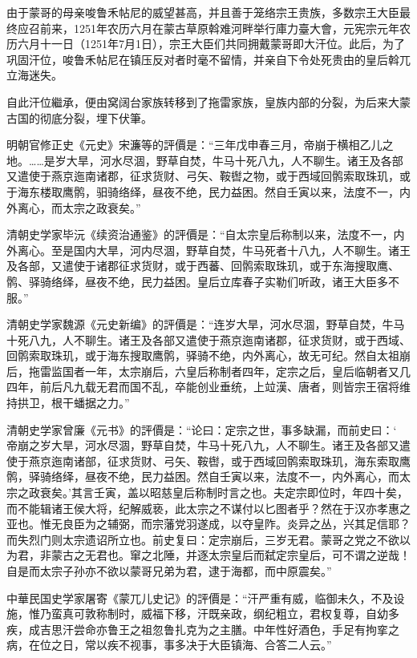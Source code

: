 由于蒙哥的母亲唆鲁禾帖尼的威望甚高，并且善于笼络宗王贵族，多数宗王大臣最终应召前来，1251年农历六月在蒙古草原斡难河畔举行庫力臺大會，元宪宗元年农历六月十一日（1251年7月1日），宗王大臣们共同拥戴蒙哥即大汗位。此后，为了巩固汗位，唆鲁禾帖尼在镇压反对者时毫不留情，并亲自下令处死贵由的皇后斡兀立海迷失。

自此汗位繼承，便由窝阔台家族转移到了拖雷家族，皇族内部的分裂，为后来大蒙古国的彻底分裂，埋下伏筆。

明朝官修正史《元史》宋濂等的評價是：“三年戊申春三月，帝崩于横相乙儿之地。……是岁大旱，河水尽涸，野草自焚，牛马十死八九，人不聊生。诸王及各部又遣使于燕京迤南诸郡，征求货财、弓矢、鞍辔之物，或于西域回鹘索取珠玑，或于海东楼取鹰鹘，驲骑络绎，昼夜不绝，民力益困。然自壬寅以来，法度不一，内外离心，而太宗之政衰矣。”

清朝史学家毕沅《续资治通鉴》的評價是：“自太宗皇后称制以来，法度不一，内外离心。至是国内大旱，河内尽涸，野草自焚，牛马死者十八九，人不聊生。诸王及各部，又遣使于诸郡征求货财，或于西蕃、回鹘索取珠玑，或于东海搜取鹰、鹘、驿骑络绎，昼夜不绝，民力益困。皇后立库春子实勒们听政，诸王大臣多不服。”

清朝史学家魏源《元史新编》的評價是：“连岁大旱，河水尽涸，野草自焚，牛马十死八九，人不聊生。诸王及各部又遣使于燕京迤南诸郡，征求货财，或于西域、回鹘索取珠玑，或于海东搜取鹰鹘，驿骑不绝，内外离心，故无可纪。然自太祖崩后，拖雷监国者一年，太宗崩后，六皇后称制者四年，定宗之后，皇后临朝者又几四年，前后凡九载无君而国不乱，卒能创业垂统，上竝漢、唐者，则皆宗王宿将维持拱卫，根干蟠据之力。”

清朝史学家曾廉《元书》的評價是：“论曰：定宗之世，事多缺漏，而前史曰：‘ 帝崩之岁大旱，河水尽涸，野草自焚，牛马十死八九，人不聊生。诸王及各部又遣使于燕京迤南诸部，征求货财、弓矢、鞍辔，或于西域回鹘索取珠玑，海东索取鹰鹘，驿骑络绎，昼夜不绝，民力益困。然自壬寅以来，法度不一，内外离心，而太宗之政衰矣。’其言壬寅，盖以昭慈皇后称制时言之也。夫定宗即位时，年四十矣，而不能辑诸王侯大将，纪解威亵，此太宗之不谋付以匕图者乎？然在于汉亦孝惠之亚也。惟无良臣为之辅弼，而宗藩党羽遂成，以夺皇阼。炎异之丛，兴其足信耶？而失烈门则太宗遗诏所立也。前史复曰：定宗崩后，三岁无君。蒙哥之党之不欲以为君，非蒙古之无君也。窜之北陲，并逐太宗皇后而弑定宗皇后，可不谓之逆哉！自是而太宗子孙亦不欲以蒙哥兄弟为君，逮于海都，而中原震矣。”

中華民国史学家屠寄《蒙兀儿史记》的評價是：“汗严重有威，临御未久，不及设施，惟乃蛮真可敦称制时，威福下移，汗既亲政，纲纪粗立，君权复尊，自幼多疾，成吉思汗尝命亦鲁王之祖忽鲁扎克为之主膳。中年性好酒色，手足有拘挛之病，在位之日，常以疾不视事，事多决于大臣镇海、合答二人云。”

